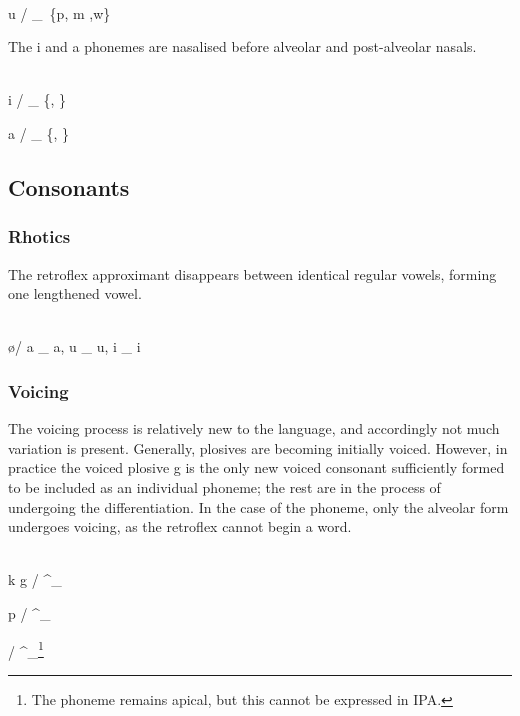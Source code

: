 \begin{definition}[Centralisation]
~\\
u \textrightarrow {} / \_~\{p, m ,w\}
\end{definition}

The i and a phonemes are nasalised before alveolar and post-alveolar nasals.

\begin{definition}[Nasalisation]
~\\
i \textrightarrow {} / \_ \{\textipa{\|]{n}}, \}

a \textrightarrow {} / \_ \{\textipa{\|]{n}}, \}
\end{definition}

\subsection{Consonants}

\subsubsection{Rhotics}

The retroflex approximant \textipa{\textturnrrtail} disappears between identical
regular vowels, forming one lengthened vowel.

\begin{definition}[]
  ~\\
  \textipa{\textturnrrtail} \textrightarrow \o / a \_ a, u \_ u, i \_ i
\end{definition}

\subsubsection{Voicing}

The voicing process is relatively new to the language, and accordingly not much
variation is present. Generally, plosives are becoming initially voiced.
However, in practice the voiced plosive g is the only new voiced consonant
sufficiently formed to be included as an individual phoneme; the rest are in the
process of undergoing the differentiation. In the case of the \textipa{\|]{t}}
phoneme, only the alveolar form undergoes voicing, as the retroflex cannot begin
a word.

\begin{definition}[Voicing]
  ~\\
  k \textrightarrow g / \^{}\_

  p \textrightarrow {} / \^{}\_

  \textipa{\|]{t}} \textrightarrow {} / \^{}\_\footnote{The phoneme
      remains apical, but this cannot be expressed in IPA.}
\end{definition}

